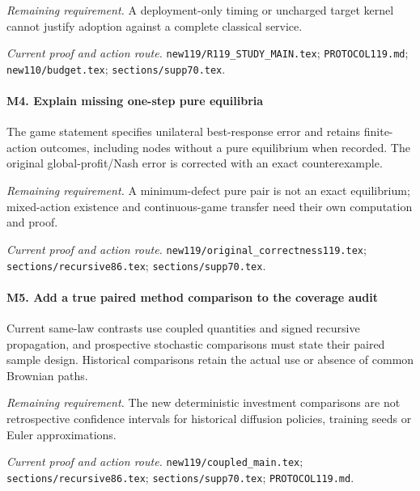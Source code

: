 \par\emph{Remaining requirement.} A deployment-only timing or uncharged target kernel cannot justify adoption against a complete classical service.

\par\emph{Current proof and action route.} \nolinkurl{new119/R119_STUDY_MAIN.tex}; \nolinkurl{PROTOCOL119.md}; \nolinkurl{new110/budget.tex}; \nolinkurl{sections/supp70.tex}.

\paragraph{M4. Explain missing one-step pure equilibria}

The game statement specifies unilateral best-response error and retains finite-action outcomes, including nodes without a pure equilibrium when recorded. The original global-profit/\allowbreak{}Nash error is corrected with an exact counterexample.

\par\emph{Remaining requirement.} A minimum-defect pure pair is not an exact equilibrium; mixed-action existence and continuous-game transfer need their own computation and proof.

\par\emph{Current proof and action route.} \nolinkurl{new119/original_correctness119.tex}; \nolinkurl{sections/recursive86.tex}; \nolinkurl{sections/supp70.tex}.

\paragraph{M5. Add a true paired method comparison to the coverage audit}

Current same-law contrasts use coupled quantities and signed recursive propagation, and prospective stochastic comparisons must state their paired sample design. Historical comparisons retain the actual use or absence of common Brownian paths.

\par\emph{Remaining requirement.} The new deterministic investment comparisons are not retrospective confidence intervals for historical diffusion policies, training seeds or Euler approximations.

\par\emph{Current proof and action route.} \nolinkurl{new119/coupled_main.tex}; \nolinkurl{sections/recursive86.tex}; \nolinkurl{sections/supp70.tex}; \nolinkurl{PROTOCOL119.md}.

